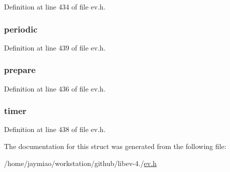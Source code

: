 \-Definition at line 434 of file ev.\-h.

\hypertarget{structev__embed_a5fbe01d0d9d8a54f2917d9d591496e4f}{
\subsubsection[{periodic}]{ {\bf periodic}}}\label{structev__embed_a5fbe01d0d9d8a54f2917d9d591496e4f}


\-Definition at line 439 of file ev.\-h.

\hypertarget{structev__embed_a4e3f46ebebe0a3daf2a1f6b8ffef7cb8}{
\subsubsection[{prepare}]{ {\bf prepare}}}\label{structev__embed_a4e3f46ebebe0a3daf2a1f6b8ffef7cb8}


\-Definition at line 436 of file ev.\-h.

\hypertarget{structev__embed_a56d2f62405e7a2bba42204f714803c7c}{
\subsubsection[{timer}]{ {\bf timer}}}\label{structev__embed_a56d2f62405e7a2bba42204f714803c7c}


\-Definition at line 438 of file ev.\-h.



\-The documentation for this struct was generated from the following file\-:\begin{DoxyCompactItemize}
\item 
/home/jaymiao/workstation/github/libev-\/4./\hyperlink{ev_8h}{ev.\-h}\end{DoxyCompactItemize}
